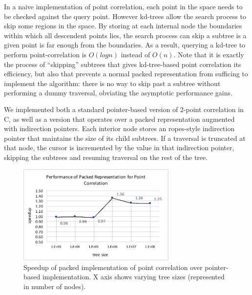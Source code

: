 \documentclass[a4paper,english]{lipics-v2016}
\begin{document}
In a naive implementation of point correlation, each point in the space needs
to be checked against the query point. However kd-trees allow the search
process to skip some regions in the space. By storing at each internal node
the boundaries within which all descendent points lies, the search process can
skip a subtree is a given point is far enough from the boundaries. As a
result, querying a kd-tree to perform point-correlation is $O(log n)$ instead
of $O(n)$. Note that it is exactly the process of ``skipping'' subtrees that
gives kd-tree-based point correlation its efficiency, but also that prevents a
normal packed representation from sufficing to implement the algorithm: there
is no way to skip past a subtree without performing a dummy traversal,
obviating the asymptotic performance gains.

We implemented both a standard pointer-based version of 2-point correlation in
C, as well as a version that operates over a packed representation augmented
with indirection pointers. Each interior node stores an ropes-style
indirection pointer that maintains the size of its child subtrees. If a
traversal is truncated at that node, the cursor is incremented by the value in
that indirection pointer, skipping the subtrees and resuming traversal on the
rest of the tree.

  
\begin{figure}[htp]
    \centering
    \includegraphics[width=0.7\textwidth]{./figs/pointCorr_perf.pdf}


   \caption{Speedup of packed implementation of point correlation over pointer-based implementation. X axis shows varying tree sizes (represented in number of nodes).}
         \label{fig:pointCorr}
\end{figure}
\end{document}
